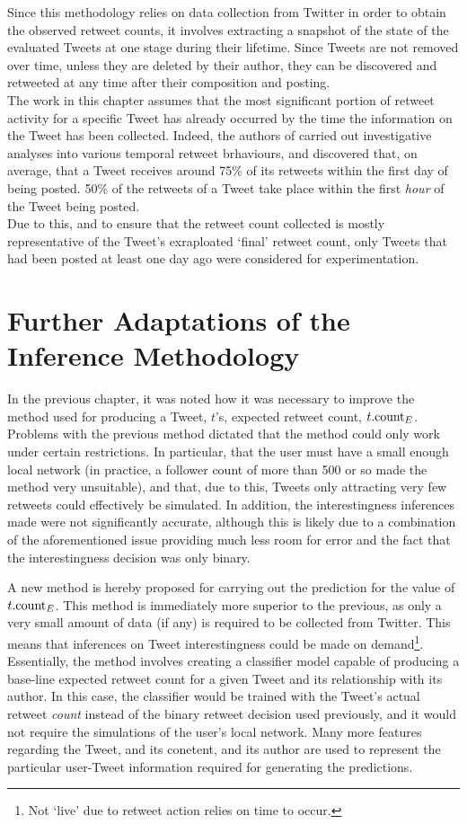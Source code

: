 Since this methodology relies on data collection from Twitter in order to obtain the observed retweet counts, it involves extracting a snapshot of the state of the evaluated Tweets at one stage during their lifetime. Since Tweets are not removed over time, unless they are deleted by their author, they can be discovered and retweeted at any time after their composition and posting.\\
The work in this chapter assumes that the most significant portion of retweet activity for a specific Tweet has already occurred by the time the information on the Tweet has been collected. Indeed, the authors of \cite{kwak10} carried out investigative analyses into various temporal retweet brhaviours, and discovered that, on average, that a Tweet receives around 75\% of its retweets within the first day of being posted. 50\% of the retweets of a Tweet take place within the first \textit{hour} of the Tweet being posted.\\
Due to this, and to ensure that the retweet count collected is mostly representative of the Tweet's exraploated `final' retweet count, only Tweets that had been posted at least one day ago were considered for experimentation.


\section{Further Adaptations of the Inference Methodology}
In the previous chapter, it was noted how it was necessary to improve the method used for producing a Tweet, $t$'s, expected retweet count, $t.\textrm{count}_E$. Problems with the previous method dictated that the method could only work under certain restrictions. In particular, that the user must have a small enough local network (in practice, a follower count of more than 500 or so made the method very unsuitable), and that, due to this, Tweets only attracting very few retweets could effectively be simulated. In addition, the interestingness inferences made were not significantly accurate, although this is likely due to a combination of the aforementioned issue providing much less room for error and the fact that the interestingness decision was only binary.

A new method is hereby proposed for carrying out the prediction for the value of $t.\textrm{count}_E$. This method is immediately more superior to the previous, as only a very small amount of data (if any) is required to be collected from Twitter. This means that inferences on Tweet interestingness could be made on demand\footnote{Not `live' due to retweet action relies on time to occur.}.\\
Essentially, the method involves creating a classifier model capable of producing a base-line expected retweet count for a given Tweet and its relationship with its author. In this case, the classifier would be trained with the Tweet's actual retweet \textit{count} instead of the binary retweet decision used previously, and it would not require the simulations of the user's local network. Many more features regarding the Tweet, and its conetent, and its author are used to represent the particular user-Tweet information required for generating the predictions.

